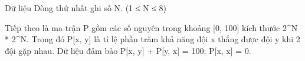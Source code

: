 Dữ liệu
Dòng thứ nhất ghi số N. (1 ≤ N ≤ 8)  

   Tiếp theo là ma trận P gồm các số nguyên trong khoảng [0, 100] kích thước 2^N * 2^N. Trong đó P[x, y] là tỉ lệ phần trăm khả năng đội x thắng được đội y khi 2 đội gặp nhau. Dữ liệu đảm bảo P[x, y] + P[y, x] = 100; P[x, x] = 0.